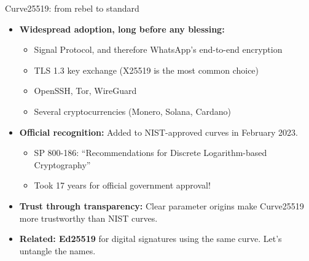 \ifdefined\PRESENTATION\else\PassOptionsToClass{handout}{beamer}\fi\documentclass[aspectratio=169, lualatex]{beamer}
\begin{document}
\begin{frame}{Curve25519: from rebel to standard}
	\begin{itemize}
		\item \textbf{Widespread adoption, long before any blessing:}
		      \begin{itemize}
			      \item Signal Protocol, and therefore WhatsApp's end-to-end encryption
			      \item TLS 1.3 key exchange (X25519 is the most common choice)
			      \item OpenSSH, Tor, WireGuard
			      \item Several cryptocurrencies (Monero, Solana, Cardano)
		      \end{itemize}
		\item \textbf{Official recognition:} Added to NIST-approved curves in February 2023.
		      \begin{itemize}
			      \item SP 800-186: ``Recommendations for Discrete Logarithm-based Cryptography''
			      \item Took 17 years for official government approval!
		      \end{itemize}
		\item \textbf{Trust through transparency:} Clear parameter origins make Curve25519 more trustworthy than NIST curves.
		\item \textbf{Related: Ed25519} for digital signatures using the same curve. Let's untangle the names.
	\end{itemize}
\end{frame}
\end{document}
